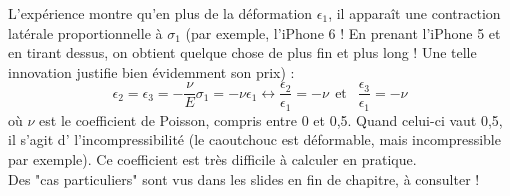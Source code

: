     L'expérience montre qu'en plus de la déformation $\epsilon_1$, il apparaît une contraction 
    latérale proportionnelle à $\sigma_1$ (par exemple, l'iPhone 6 ! En prenant l'iPhone 5 et en
    tirant dessus, on obtient quelque chose de plus fin et plus long ! Une telle innovation 
    justifie bien évidemment son prix) :
    \begin{equation}
    \epsilon_2 = \epsilon_3 = -\frac{\nu}{E}\sigma_1 = -\nu \epsilon_1 \leftrightarrow 
    \frac{\epsilon_2}{\epsilon_1}= -\nu\ \ \text{et }\ \ \frac{\epsilon_3}{\epsilon_1} = -\nu
    \end{equation}
    où $\nu$ est le coefficient de Poisson, compris entre 0 et 0,5. Quand celui-ci vaut 0,5, il
    s'agit d' l'incompressibilité (le caoutchouc est déformable, mais incompressible par exemple).
    Ce coefficient est très difficile à calculer en pratique.\\
    
    Des "cas particuliers" sont vus dans les slides en fin de chapitre, à consulter !
